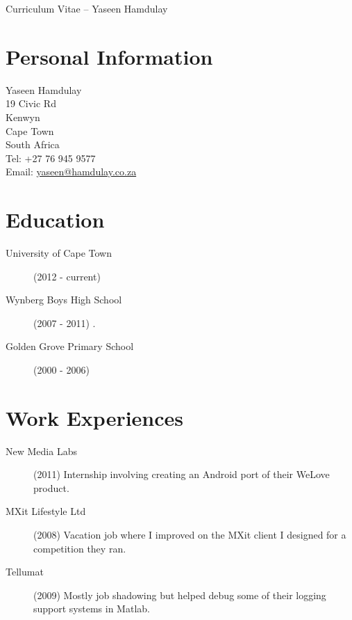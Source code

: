 \documentclass[margin,line,a4paper]{resume}
\begin{document}
    {\sc \Large Curriculum Vitae -- Yaseen Hamdulay}
    \begin{resume}
        \vspace{0.5cm}

        \section{\mysidestyle Personal Information}
            Yaseen Hamdulay\\
            19 Civic Rd\\ %
            Kenwyn\\
            Cape Town\\
            South Africa\\
            Tel: +27 76 945 9577\\
            Email: \href{mailto:yaseen@hamdulay.co.za}{yaseen@hamdulay.co.za}\\

        \section{\mysidestyle Education}
            \begin{description}
                \item[University of Cape Town] (2012 - current) 
                \item[Wynberg Boys High School] (2007 - 2011) .
                \item[Golden Grove Primary School] (2000 - 2006)
            \end{description}

        \section{\mysidestyle Work Experiences}
            \begin{description}
                \item[New Media Labs] (2011) Internship involving creating an Android port of their WeLove
                product.

                \item[MXit Lifestyle Ltd] (2008) Vacation job where I improved on the MXit
                client I designed for a competition they ran.

                \item[Tellumat] (2009) Mostly job shadowing but helped debug some of their logging support systems
                in Matlab.


\end{description}
\end{resume}
\end{document}
